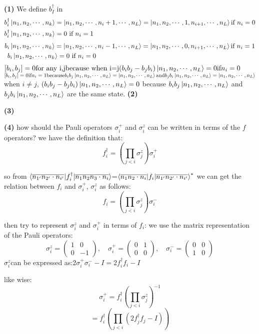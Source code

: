 \documentclass[12pt]{article}
\begin{document}
\textbf{(1)}
We define $b_I^\dagger$ in 
\[
\begin{aligned}
&b_i^\dagger\ket{n_1,n_2,\cdots,n_k}=\ket{n_1,n_2,\cdots,n_i+1,\cdots,n_L}=\ket{n_1,n_2,\cdots,1,n_{i+1},\cdots,n_L}\text{if }n_i=0 \\
&b_i^\dagger\ket{n_1,n_2,\cdots,n_k}=0\text{  if }n_i=1 \\
\end{aligned}
\]
\[
\begin{aligned}
b&_i\ket{n_1,n_2,\cdots,n_k}=\ket{n_1,n_2,\cdots,n_i-1,\cdots,n_L}=\ket{n_1,n_2,\cdots,0,n_{i+1},\cdots,n_L}\text{if }n_i=1 \\
&b_i\ket{n_1,n_2,\cdots,n_k}=0\text{  if }n_i=0 \\   
\end{aligned}
\]
$[b_i,b_j]=0 \text{for any i,j} \text{because when i=j} (b_ib_j-b_jb_i)\ket{n_1,n_2,\cdots,n_L}=0\text{if}n_i=0$
$[b_i,b_j]=0\text{if}n_i=1\text{because}b_ib_j\ket{n_1,n_2,\cdots,n_L}=\ket{n_1,n_2,\cdots,n_L} \text{and}b_jb_i\ket{n_1,n_2,\cdots,n_L}=\ket{n_1,n_2,\cdots,n_L}$
when $i\neq j$, $(b_ib_j-b_jb_i)\ket{n_1,n_2,\cdots,n_L}=0$ because $b_ib_j\ket{n_1,n_2,\cdots,n_L}$ and $b_jb_i\ket{n_1,n_2,\cdots,n_L}$ are the same state.
\textbf{(2)}

\textbf{(3)}

\textbf{(4)}
how should the Pauli operators $\sigma_i^+ $ and $\sigma_i^z $ can be written in terms of the  $f$ operators? 
we have the definition that:\[
f_i^\dagger = \left( \prod_{j<i} \sigma_j^z \right) \sigma_i^+
\]

so from $\braket{\overline{n_{1'}n_{2'}\cdot n_{i'}}|f_i^\dagger|\overline{n_1n_2n_3\cdot n_i}}$=$\braket{\overline{n_{1}n_{2}\cdot n_{i}}|f_i|\overline{n_{1'}n_{2'}\cdot n_{i'}}}^*$
we can get the relation between $f_i$ and $\sigma_i^+$, $\sigma_i^z$ as follows:
\[
f_i = \left( \prod_{j<i} \sigma_j^z \right) \sigma_i^-
\]

then try to represent $\sigma_i^z$ and $\sigma_i^+$ in terms of $f_i$:
we use the matrix representation of the Pauli operators:
\[
\sigma_i^z = \begin{pmatrix}
1 & 0 \\
0 & -1
\end{pmatrix}, \quad \sigma_i^+ = \begin{pmatrix}
0 & 1 \\
0 & 0
\end{pmatrix}, \quad \sigma_i^- = \begin{pmatrix}
0 & 0 \\
1 & 0
\end{pmatrix}
\]
$\sigma_i^z  $can be expressed as:$  2\sigma_i^+\sigma_i^- -I = 2f_i^{\dagger} f_i-I$


like wise:
\[
\sigma_i^+ = f_i^{\dagger} \left( \prod_{j<i} \sigma_j^z \right)^{-1}
\]
\[
= f_i^{\dagger} \left( \prod_{j<i} (2f_j^{\dagger} f_j - I) \right)
\]
\end{document}
